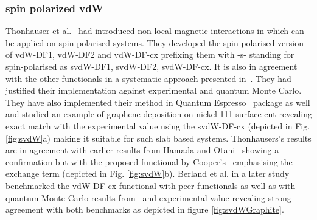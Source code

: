 \subsubsection{spin polarized vdW}
Thonhauser et al.~\cite{Thonhauser2015PRL} had introduced non-local magnetic interactions in which can be applied on spin-polarised systems. They developed the spin-polarised version of vdW-DF1, vdW-DF2 and vdW-DF-cx prefixing them with -s- standing for spin-polarised as svdW-DF1, svdW-DF2, svdW-DF-cx. It is also in agreement with the other functionals in a systematic approach presented in~\cite{Lee2015systematic}. They had justified their implementation against experimental and quantum Monte Carlo. They have also implemented their method in Quantum Espresso~\cite{Giannozzi2009} package as well and studied an example of graphene deposition on nickel 111 surface cut revealing exact match with the experimental value using the svdW-DF-cx (depicted in Fig. \ref{fig:svdW}a) making it suitable for such slab based systems. Thonhausers's results are in agreement with earlier results from Hamada and Otani~\cite{Hamada2010} showing a confirmation but with the proposed functional by Cooper's~\cite{Cooper2010} emphasising the exchange term (depicted in Fig. \ref{fig:svdW}b). Berland et al. in a later study~\cite{vdWreview} benchmarked the vdW-DF-cx functional with peer functionals as well as with quantum Monte Carlo results from~\cite{Spanu2009PRL} and experimental value revealing strong agreement with both benchmarks as depicted in figure \ref{fig:svdWGraphite}.
